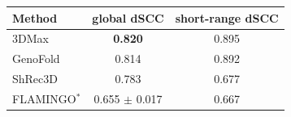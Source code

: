 \renewcommand{\arraystretch}{1.2}
\begin{tabular}{@{}lcc@{}}
\toprule
\textbf{Method} & \textbf{global dSCC} & \textbf{short-range dSCC} \\
\midrule
3DMax & \textbf{0.820} & 0.895 \\
GenoFold & 0.814 & 0.892 \\
ShRec3D & 0.783 & 0.677 \\
FLAMINGO$^{\ast}$ & 0.655 $\pm$ 0.017 & 0.667 \\
\bottomrule
\end{tabular}
